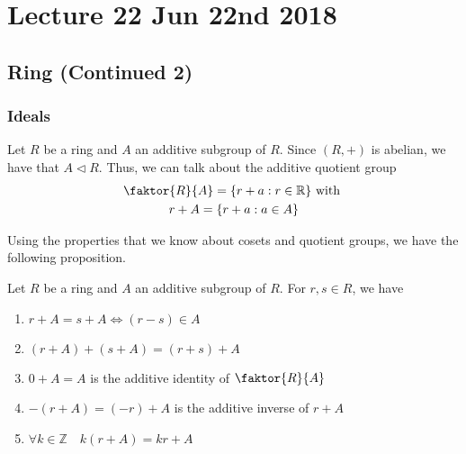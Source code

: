 \chapter{Lecture 22 Jun 22nd 2018}%
\label{chp:lecture_22_jun_22nd_2018}

\section{Ring (Continued 2)}%
\label{sec:ring_continued_2}

\subsection{Ideals}%
\label{sub:ideals}

Let $R$ be a ring and $A$ an additive subgroup of $R$. Since $(R, +)$ is abelian, we have that $A \triangleleft R$. Thus, we can talk about the additive quotient group
\begin{gather*}
  \faktor{R}{A} = \{r + a : r \in \mathbb{R} \} \text{ with } \\
  r + A = \{ r + a : a \in A \}
\end{gather*}

Using the properties that we know about cosets and quotient groups, we have the following proposition.

\begin{propo}
\label{propo:properties_of_the_additive_quotient_group}
  Let $R$ be a ring and $A$ an additive subgroup of $R$. For $r, s \in R$, we have
  \begin{enumerate}
    \item $r + A = s + A \iff (r - s) \in A$
    \item $(r + A) + (s + A) = (r + s) + A$
    \item $0 + A = A$ is the additive identity of $\faktor{R}{A}$
    \item $- (r + A) = (-r) + A$ is the additive inverse of $r + A$
    \item $\forall k \in \mathbb{Z} \quad k(r + A) = kr + A$
  \end{enumerate}
\end{propo}

